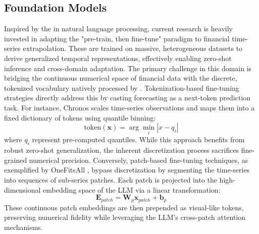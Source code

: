 \subsection{Foundation Models}

Inspired by the in natural language processing, current research is heavily invested in adapting the "pre-train, then fine-tune" paradigm to financial time-series extrapolation. These are trained on massive, heterogeneous datasets to derive generalized temporal representations, effectively enabling zero-shot inference and cross-domain adaptation. The primary challenge in this domain is bridging the continuous numerical space of financial data with the discrete, tokenized vocabulary natively processed by . Tokenization-based fine-tuning strategies directly address this by casting forecasting as a next-token prediction task. For instance, Chronos \citep{ansari2024chronos} scales time-series observations and maps them into a fixed dictionary of tokens using quantile binning:
\begin{equation}
\text{token}(\mathbf{x}) = \arg\min_i |x - q_i|
\end{equation}
where $q_i$ represent pre-computed quantiles. While this approach benefits from robust zero-shot generalization, the inherent discretization process sacrifices fine-grained numerical precision. Conversely, patch-based fine-tuning techniques, as exemplified by OneFitsAll \citep{zhou2023onefitsall}, bypass discretization by segmenting the time-series into sequences of sub-series patches. Each patch is projected into the high-dimensional embedding space of the LLM via a linear transformation:
\begin{equation}
\mathbf{E}_{patch} = \mathbf{W}_p \mathbf{x}_{patch} + \mathbf{b}_p
\end{equation}
These continuous patch embeddings are then prepended as visual-like tokens, preserving numerical fidelity while leveraging the LLM's cross-patch attention mechanisms.

